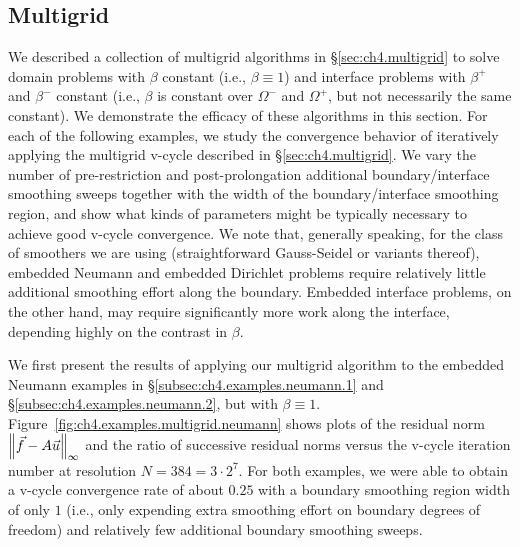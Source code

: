 \subsection{Multigrid} \label{subsec:ch4.examples.multigrid}

We described a collection of multigrid algorithms in \S\ref{sec:ch4.multigrid} to solve domain problems with $\beta$ constant (i.e., $\beta \equiv 1$) and interface problems with $\beta^+$ and $\beta^-$ constant (i.e., $\beta$ is constant over $\Omega^-$ and $\Omega^+$, but not necessarily the same constant). We demonstrate the efficacy of these algorithms in this section. For each of the following examples, we study the convergence behavior of iteratively applying the multigrid v-cycle described in \S\ref{sec:ch4.multigrid}. We vary the number of pre-restriction and post-prolongation additional boundary/interface smoothing sweeps together with the width of the boundary/interface smoothing region, and show what kinds of parameters might be typically necessary to achieve good v-cycle convergence. We note that, generally speaking, for the class of smoothers we are using (straightforward Gauss-Seidel or variants thereof), embedded Neumann and embedded Dirichlet problems require relatively little additional smoothing effort along the boundary. Embedded interface problems, on the other hand, may require significantly more work along the interface, depending highly on the contrast in $\beta$.

We first present the results of applying our multigrid algorithm to the embedded Neumann examples in \S\ref{subsec:ch4.examples.neumann.1} and \S\ref{subsec:ch4.examples.neumann.2}, but with $\beta \equiv 1$. Figure~\ref{fig:ch4.examples.multigrid.neumann} shows plots of the residual norm $\left\lVert  \vec{f} - A\vec{u}  \right\rVert_{\infty}$ and the ratio of successive residual norms versus the v-cycle iteration number at resolution $N = 384 = 3 \cdot 2^7$. For both examples, we were able to obtain a v-cycle convergence rate of about $0.25$ with a boundary smoothing region width of only $1$ (i.e., only expending extra smoothing effort on boundary degrees of freedom) and relatively few additional boundary smoothing sweeps.


